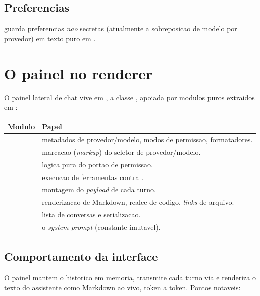 \subsection{Preferencias}

 guarda preferencias \emph{nao} secretas (atualmente a
sobreposicao de modelo por provedor) em texto puro em
.

\section{O painel no renderer}

O painel lateral de chat vive em , a classe
, apoiada por modulos puros extraidos em
:

\begin{tabularx}{\linewidth}{l Y}
\toprule
\textbf{Modulo} & \textbf{Papel} \\
\midrule
{}     & metadados de provedor/modelo, modos de permissao, formatadores. \\
   & marcacao (\emph{markup}) do seletor de provedor/modelo. \\
 & logica pura do portao de permissao. \\
     & execucao de ferramentas contra . \\
       & montagem do \emph{payload} de cada turno. \\
     & renderizacao de Markdown, realce de codigo, \emph{links} de arquivo. \\
    & lista de conversas e serializacao. \\
   & o \emph{system prompt} (constante imutavel). \\
\bottomrule
\end{tabularx}

\subsection{Comportamento da interface}

O painel mantem o historico em memoria, transmite cada turno via
 e renderiza o texto do assistente como Markdown ao vivo,
token a token. Pontos notaveis:


